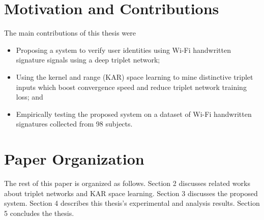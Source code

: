 \newpage
\section{Motivation and Contributions}
The main contributions of this thesis were
\begin{itemize}
\item Proposing a system to verify user identities using Wi-Fi handwritten signature signals using a deep triplet network;
\item Using the kernel and range (KAR) space learning to mine distinctive triplet inputs which boost convergence speed and reduce triplet network training loss; and
\item Empirically testing the proposed system on a dataset of Wi-Fi handwritten signatures collected from 98 subjects.
\end{itemize}

\section{Paper Organization}
The rest of this paper is organized as follows.  Section 2 discusses related works about triplet networks and KAR space learning. Section 3 discusses the proposed system. Section 4 describes this thesis's experimental and analysis results. Section 5 concludes the thesis. 
